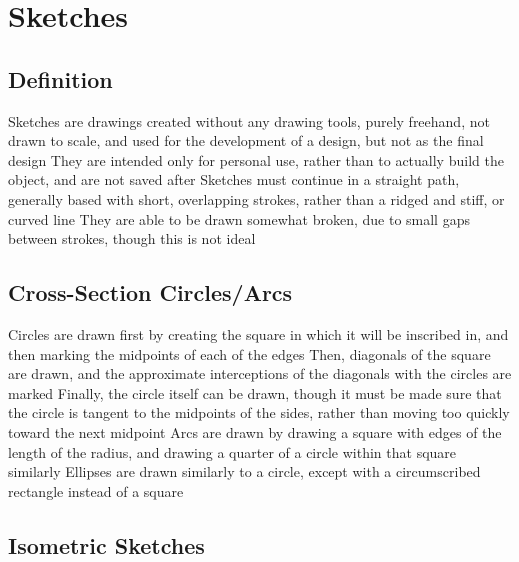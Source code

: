 \documentclass[11 pt, twoside]{article}
\newenvironment{outline*}
{
	\begin{outline}[enumerate]
	}
	{\end{outline}
}
\begin{document}
\section{Sketches}
\subsection{Definition}
\begin{outline*}
\1 Sketches are drawings created without any drawing tools, purely freehand, not drawn to scale, and used for the development of a design, but not as the final design
\2 They are intended only for personal use, rather than to actually build the object, and are not saved after
\1 Sketches must continue in a straight path, generally based with short, overlapping strokes, rather than a ridged and stiff, or curved line
\2 They are able to be drawn somewhat broken, due to small gaps between strokes, though this is not ideal
\end{outline*}
\subsection{Cross-Section Circles/Arcs}
\begin{outline*}
\1 Circles are drawn first by creating the square in which it will be inscribed in, and then marking the midpoints of each of the edges
\2 Then, diagonals of the square are drawn, and the approximate interceptions of the diagonals with the circles are marked
\2 Finally, the circle itself can be drawn, though it must be made sure that the circle is tangent to the midpoints of the sides, rather than moving too quickly toward the next midpoint
\1 Arcs are drawn by drawing a square with edges of the length of the radius, and drawing a quarter of a circle within that square similarly
\1 Ellipses are drawn similarly to a circle, except with a circumscribed rectangle instead of a square
\end{outline*}
\subsection{Isometric Sketches}
\end{document}
